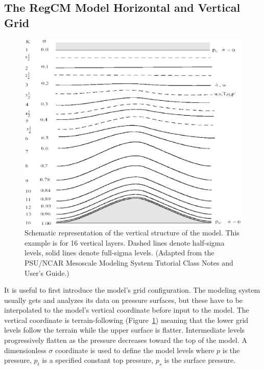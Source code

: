 \subsection{The \ac{RegCM} Model Horizontal and Vertical Grid}

\begin{figure}[!]
\begin{center}
\includegraphics[scale=0.4]{sigma_levels.eps}
\caption{Schematic representation of the vertical structure of the model.
This example is for 16 vertical layers.  Dashed lines denote half-sigma levels,
solid lines denote full-sigma levels. (Adapted from the PSU/NCAR Mesoscale
Modeling System Tutorial Class Notes and User's Guide.)}
\label{sigma_levels}
\end{center}
\end{figure}

It is useful to first introduce the model's grid configuration. The modeling
system usually gets and analyzes its data on pressure surfaces, but these have
to be interpolated to the model's vertical coordinate before input to the model.
The vertical coordinate is terrain-following (Figure~\ref{sigma_levels}) meaning
that the lower grid levels follow the terrain while the upper surface is
flatter. Intermediate levels progressively flatten as the pressure decreases
toward the top of the model. A dimensionless $\sigma$ coordinate is used to
define the model levels where $p$ is the pressure, $p_t$ is a specified constant
top pressure, $p_s$ is the surface pressure.

